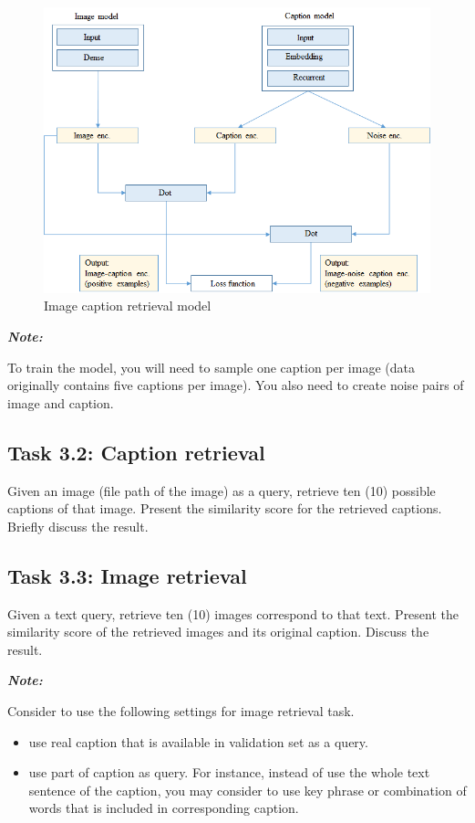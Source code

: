 \documentclass[a4paper,twoside,10pt]{article}
\begin{document}
\begin{figure}[!ht]
\centering
\includegraphics[scale=.6]{figures/arc2.png}
\caption{Image caption retrieval model}
\label{fig:img_cap_model}
\end{figure}

\justify
\textbf{\textit{Note:}}

\justify
To train the model, you will need to sample one caption per image (data originally contains five captions per image). You also need to create noise pairs of image and caption. 

\subsection*{Task 3.2: Caption retrieval}

Given an image (file path of the image) as a query, retrieve ten (10) possible captions of that image. Present the similarity score for the retrieved captions. Briefly discuss the result.

\subsection*{Task 3.3: Image retrieval}

Given a text query, retrieve ten (10) images correspond to that text. Present the similarity score of the retrieved images and its original caption. Discuss the result.

\justify
\textbf{\textit{Note:}}

\justify
Consider to use the following settings for image retrieval task. 

\begin{itemize}
    \item use real caption that is available in validation set as a query.
    \item use part of caption as query. For instance, instead of use the whole text sentence of the caption, you may consider to use key phrase or combination of words that is included in corresponding caption. 
\end{itemize}
\end{document}
